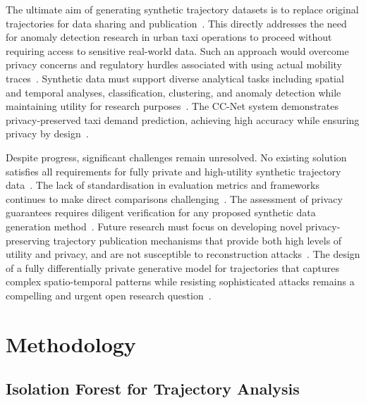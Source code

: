 \documentclass[runningheads]{llncs}
\begin{document}
The ultimate aim of generating synthetic trajectory datasets is to replace original trajectories for data sharing and publication~\cite{Buchholz2024SoK,Rao2021LSTMTrajGAN,Liu2018TrajGANs}. This directly addresses the need for anomaly detection research in urban taxi operations to proceed without requiring access to sensitive real-world data. Such an approach would overcome privacy concerns and regulatory hurdles associated with using actual mobility traces~\cite{Buchholz2024SoK,Rao2021LSTMTrajGAN,Liu2018TrajGANs}. Synthetic data must support diverse analytical tasks including spatial and temporal analyses, classification, clustering, and anomaly detection while maintaining utility for research purposes~\cite{Rao2021LSTMTrajGAN,Chen2011DPTP}. The CC-Net system demonstrates privacy-preserved taxi demand prediction, achieving high accuracy while ensuring privacy by design~\cite{Ozeki2023PPTP}.

Despite progress, significant challenges remain unresolved. No existing solution satisfies all requirements for fully private and high-utility synthetic trajectory data~\cite{Buchholz2024SoK}. The lack of standardisation in evaluation metrics and frameworks continues to make direct comparisons challenging~\cite{Primault2019LongRoad,Jin2023SurveyExpStudy}. The assessment of privacy guarantees requires diligent verification for any proposed synthetic data generation method~\cite{Buchholz2024SoK}. Future research must focus on developing novel privacy-preserving trajectory publication mechanisms that provide both high levels of utility and privacy, and are not susceptible to reconstruction attacks~\cite{Buchholz2022RAoPT,Buchholz2024SoK,Primault2019LongRoad}. The design of a fully differentially private generative model for trajectories that captures complex spatio-temporal patterns while resisting sophisticated attacks remains a compelling and urgent open research question~\cite{Buchholz2024SoK,Buchholz2022RAoPT}.


\section{Methodology}
\label{sec:methodology}

\subsection{Isolation Forest for Trajectory Analysis}
\label{sec:iso}

\begin{compactoutline}
\end{compactoutline}
\end{document}
